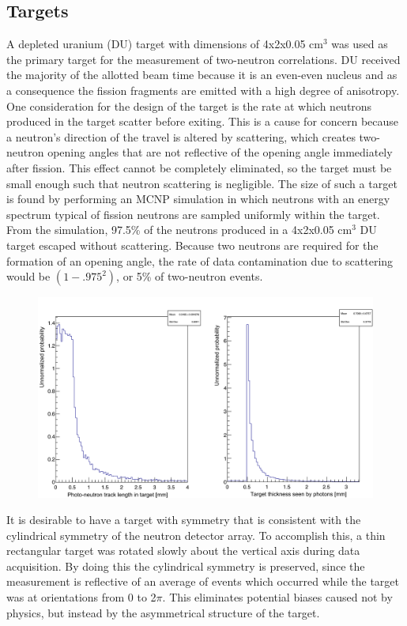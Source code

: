 \subsection{Targets}
A depleted uranium (DU) target with dimensions of 4x2x0.05 $\text{cm}^3$ was used as the primary target for the measurement of two-neutron correlations.
DU received the majority of the allotted beam time because it is an even-even nucleus and as a consequence the fission fragments are emitted with a high degree of anisotropy.
One consideration for the design of the target is the rate at which neutrons produced in the target scatter before exiting.
This is a cause for concern because a neutron's direction of the travel is altered by scattering, which creates two-neutron opening angles that are not reflective of the opening angle immediately after fission.
This effect cannot be completely eliminated, so the target must be small enough such that neutron scattering is negligible.
The size of such a target is found by performing an MCNP simulation in which neutrons with an energy spectrum typical of fission neutrons are sampled uniformly within the target.
From the simulation, 97.5\% of the neutrons produced in a 4x2x0.05 $\text{cm}^3$ DU target escaped without scattering.
Because two neutrons are required for the formation of an opening angle, the rate of data contamination due to scattering would be $(1-.975^2)$, or 5\% of two-neutron events.
\begin{figure}
    \centering
    \includegraphics[width = \textwidth]{Content/Methods/ScatteringInTarget.png}
    \caption{}
    \label{fig:ScatteringInTarget}
\end{figure}

It is desirable to have a target with symmetry that is consistent with the cylindrical symmetry of the neutron detector array.
To accomplish this, a thin rectangular target was rotated slowly about the vertical axis during data acquisition.
By doing this the cylindrical symmetry is preserved, since the measurement is reflective of an average of events which occurred while the target was at orientations from 0 to 2$\pi$.
This eliminates potential biases caused not by physics, but instead by the asymmetrical structure of the target.

